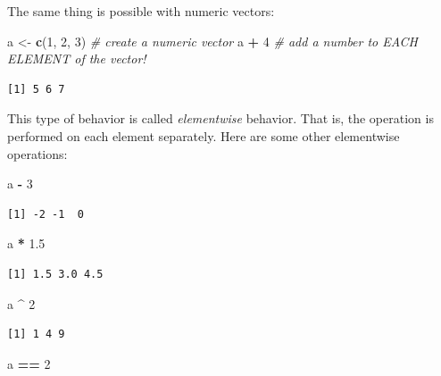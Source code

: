 \documentclass[
]{article}
\newenvironment{Shaded}{\begin{snugshade}}{\end{snugshade}}
\newcommand{\CommentTok}[1]{\textcolor[rgb]{0.56,0.35,0.01}{\textit{#1}}}
\newcommand{\DecValTok}[1]{\textcolor[rgb]{0.00,0.00,0.81}{#1}}
\newcommand{\FloatTok}[1]{\textcolor[rgb]{0.00,0.00,0.81}{#1}}
\newcommand{\KeywordTok}[1]{\textcolor[rgb]{0.13,0.29,0.53}{\textbf{#1}}}
\newcommand{\NormalTok}[1]{#1}
\newcommand{\OperatorTok}[1]{\textcolor[rgb]{0.81,0.36,0.00}{\textbf{#1}}}
\newcommand{\StringTok}[1]{\textcolor[rgb]{0.31,0.60,0.02}{#1}}
\begin{document}
The same thing is possible with numeric vectors:

\begin{Shaded}
\begin{Highlighting}[]
\NormalTok{a <-}\StringTok{ }\KeywordTok{c}\NormalTok{(}\DecValTok{1}\NormalTok{, }\DecValTok{2}\NormalTok{, }\DecValTok{3}\NormalTok{)   }\CommentTok{# create a numeric vector}
\NormalTok{a }\OperatorTok{+}\StringTok{ }\DecValTok{4}             \CommentTok{# add a number to EACH ELEMENT of the vector!}
\end{Highlighting}
\end{Shaded}

\begin{verbatim}
[1] 5 6 7
\end{verbatim}

This type of behavior is called \emph{elementwise} behavior. That is, the operation is performed on each element separately.
Here are some other elementwise operations:

\begin{Shaded}
\begin{Highlighting}[]
\NormalTok{a }\OperatorTok{-}\StringTok{ }\DecValTok{3}
\end{Highlighting}
\end{Shaded}

\begin{verbatim}
[1] -2 -1  0
\end{verbatim}

\begin{Shaded}
\begin{Highlighting}[]
\NormalTok{a }\OperatorTok{*}\StringTok{ }\FloatTok{1.5}
\end{Highlighting}
\end{Shaded}

\begin{verbatim}
[1] 1.5 3.0 4.5
\end{verbatim}

\begin{Shaded}
\begin{Highlighting}[]
\NormalTok{a }\OperatorTok{^}\StringTok{ }\DecValTok{2}
\end{Highlighting}
\end{Shaded}

\begin{verbatim}
[1] 1 4 9
\end{verbatim}

\begin{Shaded}
\begin{Highlighting}[]
\NormalTok{a }\OperatorTok{==}\StringTok{ }\DecValTok{2}
\end{Highlighting}
\end{Shaded}
\end{document}
